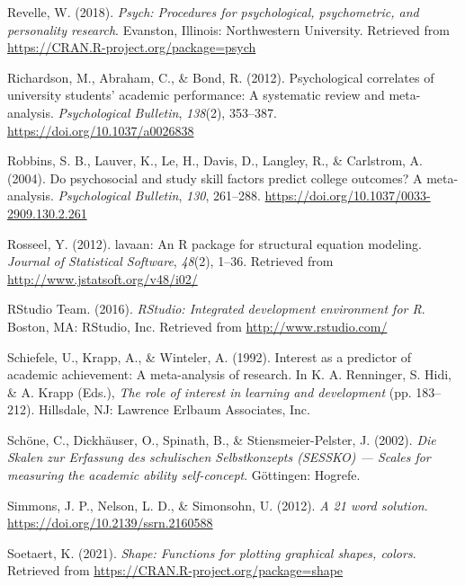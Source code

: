 \documentclass[
  man]{apa6}
\newlength{\cslhangindent}
\newlength{\cslentryspacingunit} %
\newenvironment{CSLReferences}[2] %
 {%
  \setlength{\parindent}{0pt}
  \ifodd #1
  \let\oldpar\par
  \def\par{\hangindent=\cslhangindent\oldpar}
  \fi
  \setlength{\parskip}{#2\cslentryspacingunit}
 }%
 {}
\begin{document}
\begin{CSLReferences}{1}{0}
\leavevmode{}%
Revelle, W. (2018). \emph{Psych: Procedures for psychological, psychometric, and personality research}. Evanston, Illinois: Northwestern University. Retrieved from \url{https://CRAN.R-project.org/package=psych}

\leavevmode{}%
Richardson, M., Abraham, C., \& Bond, R. (2012). Psychological correlates of university students' academic performance: A systematic review and meta-analysis. \emph{Psychological Bulletin}, \emph{138}(2), 353--387. \url{https://doi.org/10.1037/a0026838}

\leavevmode{}%
Robbins, S. B., Lauver, K., Le, H., Davis, D., Langley, R., \& Carlstrom, A. (2004). Do psychosocial and study skill factors predict college outcomes? A meta-analysis. \emph{Psychological Bulletin}, \emph{130}, 261--288. \url{https://doi.org/10.1037/0033-2909.130.2.261}

\leavevmode{}%
Rosseel, Y. (2012). {lavaan}: An {R} package for structural equation modeling. \emph{Journal of Statistical Software}, \emph{48}(2), 1--36. Retrieved from \url{http://www.jstatsoft.org/v48/i02/}

\leavevmode{}%
RStudio Team. (2016). \emph{RStudio: Integrated development environment for {R}}. Boston, MA: RStudio, Inc. Retrieved from \url{http://www.rstudio.com/}

\leavevmode{}%
Schiefele, U., Krapp, A., \& Winteler, A. (1992). Interest as a predictor of academic achievement: A meta-analysis of research. In K. A. Renninger, S. Hidi, \& A. Krapp (Eds.), \emph{The role of interest in learning and development} (pp. 183--212). Hillsdale, NJ: Lawrence Erlbaum Associates, Inc.

\leavevmode{}%
Schöne, C., Dickhäuser, O., Spinath, B., \& Stiensmeier-Pelster, J. (2002). \emph{{Die Skalen zur Erfassung des schulischen Selbstkonzepts (SESSKO) --- Scales for measuring the academic ability self-concept}}. G{ö}ttingen: Hogrefe.

\leavevmode{}%
Simmons, J. P., Nelson, L. D., \& Simonsohn, U. (2012). \emph{A 21 word solution}. \url{https://doi.org/10.2139/ssrn.2160588}

\leavevmode{}%
Soetaert, K. (2021). \emph{Shape: Functions for plotting graphical shapes, colors}. Retrieved from \url{https://CRAN.R-project.org/package=shape}


\end{CSLReferences}
\end{document}
